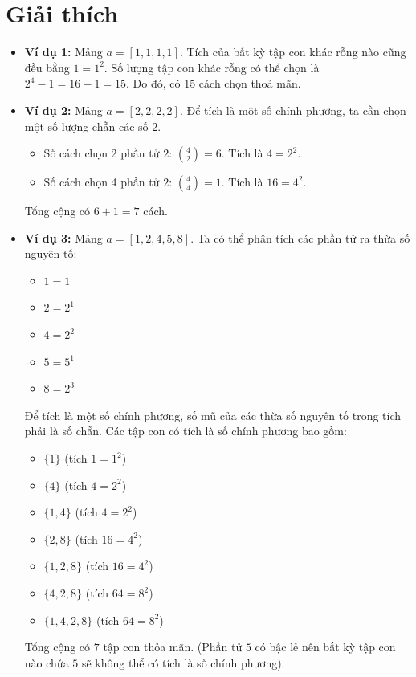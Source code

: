 \documentclass[11pt]{article}
\begin{document}
\section*{Giải thích}
\begin{itemize}
    \item \textbf{Ví dụ 1:} Mảng $a = [1, 1, 1, 1]$. Tích của bất kỳ tập con khác rỗng nào cũng đều bằng $1 = 1^2$.
Số lượng tập con khác rỗng có thể chọn là $2^4 - 1 = 16 - 1 = 15$.
Do đó, có $15$ cách chọn thoả mãn.

    \item \textbf{Ví dụ 2:} Mảng $a = [2, 2, 2, 2]$. Để tích là một số chính phương, ta cần chọn một số lượng chẵn các số $2$.
    \begin{itemize}
        \item Số cách chọn 2 phần tử $2$: $\binom{4}{2} = 6$. Tích là $4 = 2^2$.
        \item Số cách chọn 4 phần tử $2$: $\binom{4}{4} = 1$. Tích là $16 = 4^2$.
    \end{itemize}
    Tổng cộng có $6 + 1 = 7$ cách.

    \item \textbf{Ví dụ 3:} Mảng $a = [1, 2, 4, 5, 8]$. Ta có thể phân tích các phần tử ra thừa số nguyên tố:
    \begin{itemize}
        \item $1 = 1$
        \item $2 = 2^1$
        \item $4 = 2^2$
        \item $5 = 5^1$
        \item $8 = 2^3$
    \end{itemize}
    Để tích là một số chính phương, số mũ của các thừa số nguyên tố trong tích phải là số chẵn.
    Các tập con có tích là số chính phương bao gồm:
    \begin{itemize}
        \item $\{1\}$ (tích $1 = 1^2$)
        \item $\{4\}$ (tích $4 = 2^2$)
        \item $\{1, 4\}$ (tích $4 = 2^2$)
        \item $\{2, 8\}$ (tích $16 = 4^2$)
        \item $\{1, 2, 8\}$ (tích $16 = 4^2$)
        \item $\{4, 2, 8\}$ (tích $64 = 8^2$)
        \item $\{1, 4, 2, 8\}$ (tích $64 = 8^2$)
    \end{itemize}
    Tổng cộng có $7$ tập con thỏa mãn. (Phần tử $5$ có bậc lẻ nên bất kỳ tập con nào chứa $5$ sẽ không thể có tích là số chính phương).
\end{itemize}
\end{document}
